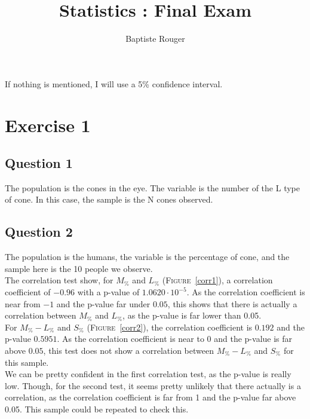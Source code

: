\documentclass[12pt,a4paper]{article}
\author{Baptiste Rouger}
\title{Statistics : Final Exam}
\begin{document}
\maketitle

If nothing is mentioned, I will use a 5\% confidence interval.
\section*{Exercise 1}
\subsection*{Question 1}
The population is the cones in the eye. The variable is the number of the L type of cone. In this case, the sample is the N cones observed.

\subsection*{Question 2}
The population is the humans, the variable is the percentage of cone, and the sample here is the 10 people we observe.\\

The correlation test show, for $M_\%$ and $L_\%$ (\textsc{Figure}~\ref{corr1}), a correlation coefficient of $-0.96$ with a p-value of $1.0620\cdot 10^{-5}$. As the correlation coefficient is near from $-1$ and the p-value far under $0.05$, this shows that there is actually a correlation between $M_\%$ and $L_\%$, as the p-value is far lower than 0.05.\\

For $M_\% - L_\%$ and $S_\%$ (\textsc{Figure}~\ref{corr2}), the correlation coefficient is $0.192$ and the p-value $0.5951$. As the correlation coefficient is near to $0$ and the p-value is far above $0.05$, this test does not show a correlation between $M_\% - L_\%$ and $S_\%$ for this sample.\\

We can be pretty confident in the first correlation test, as the p-value is really low. Though, for the second test, it seems pretty unlikely that there actually is a correlation, as the correlation coefficient is far from 1 and the p-value far above 0.05. This sample could be repeated to check this.
\end{document}
